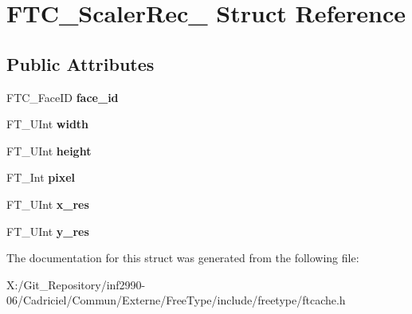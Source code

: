 \hypertarget{struct_f_t_c___scaler_rec__}{\section{F\-T\-C\-\_\-\-Scaler\-Rec\-\_\- Struct Reference}
\label{struct_f_t_c___scaler_rec__}
}
\subsection*{Public Attributes}
\begin{DoxyCompactItemize}
\item 
\hypertarget{struct_f_t_c___scaler_rec___a8e963aa619409e646558fe7aa272e81f}{F\-T\-C\-\_\-\-Face\-I\-D {\bfseries face\-\_\-id}}\label{struct_f_t_c___scaler_rec___a8e963aa619409e646558fe7aa272e81f}

\item 
\hypertarget{struct_f_t_c___scaler_rec___a11e13d907ca4661bf7c1d98fffecf321}{F\-T\-\_\-\-U\-Int {\bfseries width}}\label{struct_f_t_c___scaler_rec___a11e13d907ca4661bf7c1d98fffecf321}

\item 
\hypertarget{struct_f_t_c___scaler_rec___a9b3a9b4d7148bbaa4daaae1e1fbb2dbc}{F\-T\-\_\-\-U\-Int {\bfseries height}}\label{struct_f_t_c___scaler_rec___a9b3a9b4d7148bbaa4daaae1e1fbb2dbc}

\item 
\hypertarget{struct_f_t_c___scaler_rec___ab78868341e2d66f17e6f1d77e9e054d2}{F\-T\-\_\-\-Int {\bfseries pixel}}\label{struct_f_t_c___scaler_rec___ab78868341e2d66f17e6f1d77e9e054d2}

\item 
\hypertarget{struct_f_t_c___scaler_rec___a886c7c1230dc5d5e6b3fc32d06274752}{F\-T\-\_\-\-U\-Int {\bfseries x\-\_\-res}}\label{struct_f_t_c___scaler_rec___a886c7c1230dc5d5e6b3fc32d06274752}

\item 
\hypertarget{struct_f_t_c___scaler_rec___accb53c7a9aeebb41c05f48d14d3dfe71}{F\-T\-\_\-\-U\-Int {\bfseries y\-\_\-res}}\label{struct_f_t_c___scaler_rec___accb53c7a9aeebb41c05f48d14d3dfe71}

\end{DoxyCompactItemize}


The documentation for this struct was generated from the following file\-:\begin{DoxyCompactItemize}
\item 
X\-:/\-Git\-\_\-\-Repository/inf2990-\/06/\-Cadriciel/\-Commun/\-Externe/\-Free\-Type/include/freetype/ftcache.\-h\end{DoxyCompactItemize}
